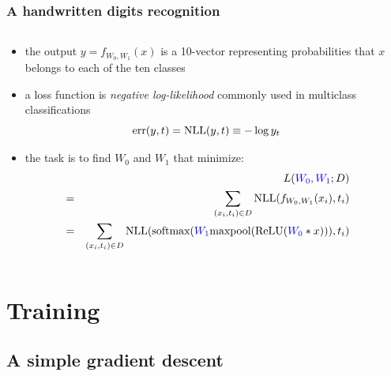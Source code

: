 \documentclass[12pt,dvipdfmx]{beamer}
\newcommand{\ao}[1]{{\color{blue}#1}}
\begin{document}
\begin{frame}
\frametitle{A handwritten digits recognition}
\begin{columns}
\begin{column}{0.75\textwidth}
\begin{itemize}
\item<1-> the output $y = f_{W_0,W_1}(x)$
  is a 10-vector representing probabilities that $x$ belongs to each of the ten classes


\item<2-> a loss function is {\it negative log-likelihood}
  commonly used in multiclass classifications
  \[ \mbox{err}(y, t) = \mbox{NLL}(y, t) \equiv - \log y_t \]

\item<3> the task is to find $W_0$ and $W_1$ that minimize:
  {\scriptsize
  \begin{eqnarray*}
    &  & L(\ao{W_0, W_1}; D) \\
    & = & \sum_{(x_i,t_i)\in D} \nll(f_{W_0,W_1}(x_i), t_i) \\
    & = & \sum_{(x_i,t_i)\in D}
          \nll(\softmax(\ao{W_1} \maxpool(\ReLU(\ao{W_0} \ast x))), t_i)
  \end{eqnarray*}}
\end{itemize}
\end{column}

\begin{column}{0.25\textwidth}
\begin{center}
\def\svgwidth{0.7\textwidth}
{\tiny}
\end{center}
\end{column}
\end{columns}
\end{frame}

\section{Training}

\subsection{A simple gradient descent}
\end{document}
